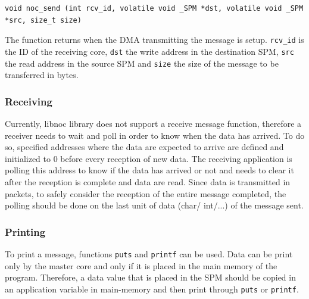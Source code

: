 \documentclass[a4paper,fontsize=10pt,twoside,DIV15,BCOR12mm,headinclude=true,footinclude=false,pagesize,bibtotoc]{scrbook}
\newcommand{\code}[1]{{\texttt{#1}}}
\begin{document}
\begin{lstlisting}
void noc_send (int rcv_id, volatile void _SPM *dst, volatile void _SPM *src, size_t size)
\end{lstlisting}

The function returns when the DMA transmitting the message is setup. \code{rcv\_id}
is the ID of the receiving core, \code{dst} the write address
in the destination SPM, \code{src} the read address
in the source SPM and \code{size} the size of the message to be transferred in bytes.



\subsubsection{Receiving}
Currently, libnoc library does not support a receive message function,
therefore a receiver needs to wait and poll in order to know when the data has arrived.
To do so, specified addresses where the data are expected to arrive are defined and
initialized to 0 before every reception of new data. The receiving application is polling this address to
know if the data has arrived or not and needs to clear it after the reception is complete and data are read.
Since data is transmitted in packets, to safely consider the reception of the entire message
completed, the polling should be done on the last unit of data (char/ int/...) of the message sent.


\subsubsection{Printing}
To print a message, functions \code{puts} and \code{printf} can be used. Data can be print only
by the master core and only if it is placed in the main memory of the program. Therefore,
a data value that is placed in the SPM should be copied in an application variable in main-memory
and then print through \code{puts} or \code{printf}. 

\end{document}
